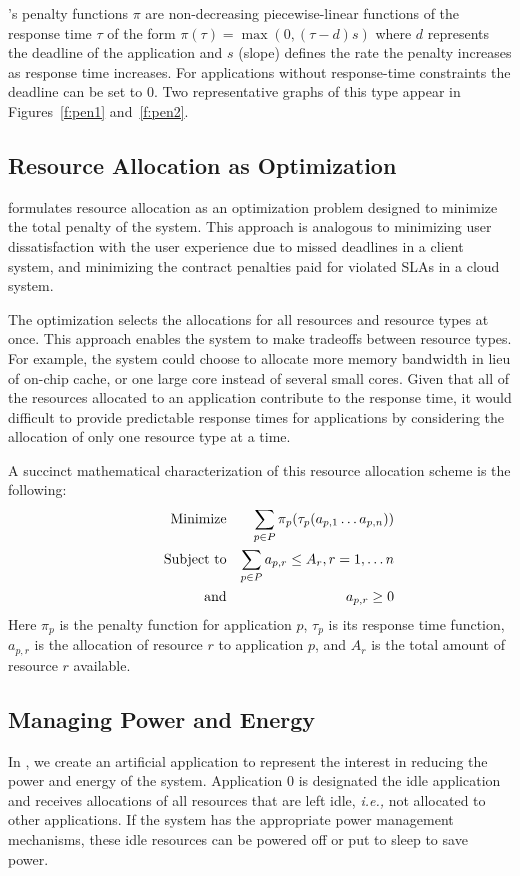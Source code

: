 \pacora's penalty functions $\pi$ are non-decreasing piecewise-linear
functions of the response time $\tau$ of the form $\pi(\tau) = \max(0, (\tau - d)s)$
where $d$ represents the deadline of the application and $s$ (slope)
defines the rate the penalty increases as response time increases. For
applications without response-time constraints the deadline can be set
to $0$. Two representative graphs of this type appear in
Figures~\ref{f:pen1} and~\ref{f:pen2}.

\subsection{Resource Allocation as Optimization}

\pacora formulates resource allocation as an optimization problem
designed to minimize the total penalty of the system. This approach is
analogous to minimizing user dissatisfaction with the user experience
due to missed deadlines in a client system, and minimizing the contract
penalties paid for violated SLAs in a cloud
system.

The optimization selects the allocations for all resources and
resource types at once.  This approach enables the system to make
tradeoffs between resource types.  For example, the system could
choose to allocate more memory bandwidth in lieu of on-chip cache, or
one large core instead of several small cores.  Given that all of the
resources allocated to an application contribute to the response time,
it would difficult to provide predictable response times for
applications by considering the allocation of only one resource type at a
time.

A succinct mathematical characterization of this resource allocation scheme is the following:
\begin{eqnarray}
& \makebox[1in][r]{Minimize}   & \sum_{p\in P} {\pi_p(\tau_p(a_{p,1}\ldots a_{p,n}))}  \\
& \makebox[1in][r]{Subject to} & \sum_{p\in P} a_{p,r} \leq A_r, r = 1,\ldots n        \\
& \makebox[1in][r]{and}        & a_{p,r} \geq 0
\end{eqnarray}
Here $\pi_p$ is the penalty function for application $p$,
$\tau_p$ is its response time function,
$a_{p,r}$ is the allocation of resource $r$ to application $p$,
and $A_r$ is the total amount of resource $r$ available. 

\subsection{Managing Power and Energy}
In \pacora, we create an artificial application to represent the
interest in reducing the power and energy of the system.  Application 0 is
designated the idle application and receives allocations of all
resources that are left idle, \emph{i.e.,} not allocated to other
applications.  If the system has the appropriate power management mechanisms, these idle resources can be powered off or put to sleep to save power.

